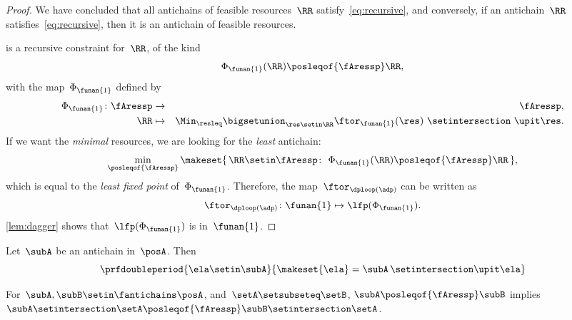 \begin{proof}
    We have concluded that all antichains of feasible resources~$\RR$ satisfy~\cref{eq:recursive}, and conversely, if an antichain~$\RR$ satisfies~\cref{eq:recursive}, then it is an antichain of feasible resources.

     is a recursive constraint for~$\RR$, of the kind
    \begin{equation}
        \Phi_{\funan{1}}(\RR)\posleqof{\fAressp}\RR,
    \end{equation}
    with the map~$\Phi_{\funan{1}}$ defined by
    \begin{eqnarray}
        \Phi_{\funan{1}}\colon \fAressp & \to     & \fAressp,\label{eq:bigphi} \\
        \RR                             & \mapsto & \Min_{\resleq}\bigsetunion_{\res\setin\RR}\ftor_{\funan{1}}(\res)\ \setintersection\ \upit\res.\nonumber
    \end{eqnarray}
    If we want the \emph{minimal} resources, we are looking for the \emph{least} antichain:
    \begin{equation}
        \min_{\posleqof{\fAressp}}\makeset{\,\RR\setin\fAressp\colon\ \Phi_{\funan{1}}(\RR)\posleqof{\fAressp}\RR\,},
    \end{equation}
    which is equal to the \emph{least fixed point }of~$\Phi_{\funan{1}}$.
    Therefore, the map~$\ftor_{\dploop(\adp)}$ can be written as
    \begin{equation}
        \ftor_{\dploop(\adp)}\colon\funan{1}\mapsto\lfp(\Phi_{\funan{1}}).
        \label{eq:loop_fixpoint}
    \end{equation}
    \cref{lem:dagger} shows that~$\lfp(\Phi_{\funan{1}})$ is \scottcontinuous in~$\funan{1}$.
\end{proof}
\begin{lemma}
    \label{lem:antichain-write}
    Let~$\subA$ be an antichain in~$\posA$.
    Then
    \begin{equation}
        \prfdoubleperiod{
            \ela\setin \subA
        }{
            \makeset{\ela}=\subA\,\setintersection\upit \ela
        }
    \end{equation}
\end{lemma}

\begin{lemma}
    \label{lem:antichain_inter}
    For~$\subA,\subB\setin\fantichains\posA$, and~$\setA \setsubseteq \setB$,
    $\subA\posleqof{\fAressp}\subB$ implies~$\subA \setintersection \setA \posleqof{\fAressp}\subB\setintersection \setA$.
\end{lemma}


